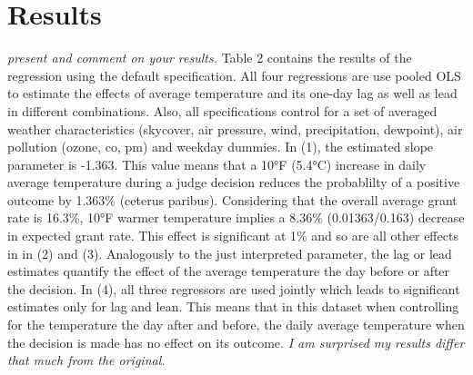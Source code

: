 \documentclass[11pt]{article}
\begin{document}
\section{Results}
\textit{present and comment on your results.} \newline
Table 2 contains the results of the regression using the default specification. All four regressions are use pooled OLS to estimate the effects of average temperature and its one-day lag as well as lead in different combinations. Also, all specifications control for a set of averaged weather characteristics (skycover, air pressure, wind, precipitation, dewpoint), air pollution (ozone, co, pm) and weekday dummies. 
In (1), the estimated slope parameter is -1.363. This value means that a 10°F (5.4°C) increase in daily average temperature during a judge decision reduces the probablilty of a positive outcome by 1.363\% (ceterus paribus). Considering that the overall average grant rate is 16.3\%, 10°F warmer temperature implies a 8.36\% (0.01363/0.163) decrease in expected grant rate. This effect is significant at 1\% and so are all other effects in in (2) and (3). Analogously to the just interpreted parameter, the lag or lead estimates quantify the effect of the average temperature the day before or after the decision. In (4), all three regressors are used jointly which leads to significant estimates only for lag and lean. This means that in this dataset when controlling for the temperature the day after and before, the daily average temperature when the decision is made has no effect on its outcome. 
\textit{I am surprised my results differ that much from the original.}	
\end{document}
